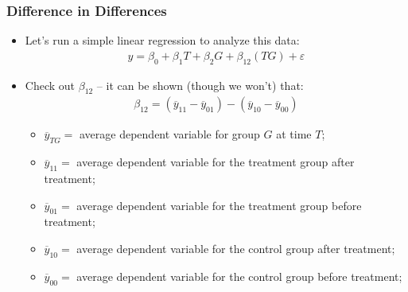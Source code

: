 \documentclass[aspectratio=169]{beamer}
\theoremstyle{principle}
\begin{document}
\begin{frame}
\frametitle{Difference in Differences}

\begin{itemize}
\item Let's run a simple linear regression to analyze this data:\huge
\begin{align*}
y = \beta_0 + \beta_1T + \beta_2G + \beta_{12}(TG) + \varepsilon
\end{align*}

\normalsize
\item Check out $\beta_{12}$ -- it can be shown (though we won't) that:
\begin{align*}
\beta_{12} = (\overline{y}_{11} - \overline{y}_{01}) - (\overline{y}_{10} - \overline{y}_{00})
\end{align*}
\begin{itemize}
\item $\overline{y}_{TG} = $ average dependent variable for group $G$ at time $T$;
\item[]\color{white} $\overline{y}_{11} = $ average dependent variable for the treatment group after treatment;
\item[]\color{white} $\overline{y}_{01} = $ average dependent variable for the treatment group before treatment;
\item[]\color{white} $\overline{y}_{10} = $ average dependent variable for the control group after treatment;
\item[]\color{white} $\overline{y}_{00} = $ average dependent variable for the control group before treatment;
\end{itemize}
\end{itemize}

\end{frame}
\end{document}

